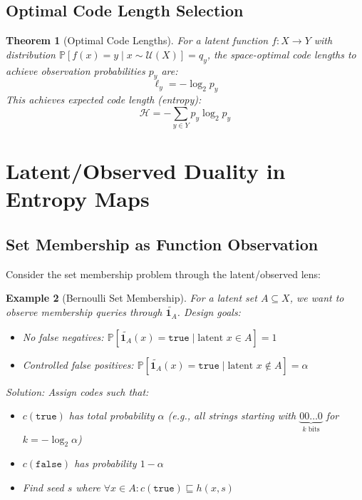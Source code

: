 \documentclass[11pt,final,hidelinks]{article}
\newtheorem{theorem}{Theorem}[section]
\newtheorem{example}[theorem]{Example}
\newcommand{\obs}[1]{\widetilde{#1}}  %
\newcommand{\Indicator}[1]{\mathbf{1}_{#1}}
\newcommand{\ProbCond}[2]{\mathbb{P}\left[#1 \mid #2\right]}
\newcommand{\fprate}{\alpha}
\newcommand{\True}{\mathtt{true}}
\newcommand{\False}{\mathtt{false}}
\begin{document}
\subsection{Optimal Code Length Selection}

\begin{theorem}[Optimal Code Lengths]
For a latent function $f: X \to Y$ with distribution $\ProbCond{f(x) = y}{x \sim \mathcal{U}(X)} = q_y$, the space-optimal code lengths to achieve observation probabilities $p_y$ are:
\begin{equation}
\ell_y = -\log_2 p_y
\end{equation}
This achieves expected code length (entropy):
\begin{equation}
\mathcal{H} = -\sum_{y \in Y} p_y \log_2 p_y
\end{equation}
\end{theorem}

\section{Latent/Observed Duality in Entropy Maps}

\subsection{Set Membership as Function Observation}

Consider the set membership problem through the latent/observed lens:

\begin{example}[Bernoulli Set Membership]
For a latent set $A \subseteq X$, we want to observe membership queries through $\obs{\Indicator{A}}$. Design goals:
\begin{itemize}
    \item No false negatives: $\ProbCond{\obs{\Indicator{A}}(x) = \True}{\text{latent } x \in A} = 1$
    \item Controlled false positives: $\ProbCond{\obs{\Indicator{A}}(x) = \True}{\text{latent } x \notin A} = \fprate$
\end{itemize}

Solution: Assign codes such that:
\begin{itemize}
    \item $c(\True)$ has total probability $\fprate$ (e.g., all strings starting with $\underbrace{00\ldots0}_{k \text{ bits}}$ for $k = -\log_2 \fprate$)
    \item $c(\False)$ has probability $1 - \fprate$
    \item Find seed $s$ where $\forall x \in A: c(\True) \sqsubseteq h(x, s)$
\end{itemize}
\end{example}
\end{document}
